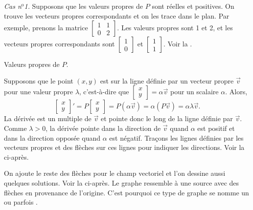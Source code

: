 \emph{Cas n$^\text{o}$1.} Supposons que les valeurs propres de $P$ sont réelles et positives. On trouve les vecteurs propres correspondants et on les trace dans le plan. Par exemple, prenons la matrice $\left[ \begin{smallmatrix} 1 & 1 \\ 0 & 2 \end{smallmatrix}
\right]$.
Les valeurs propres sont 1 et 2, et les vecteurs propres correspondants sont
$\left[ \begin{smallmatrix} 1 \\ 0 \end{smallmatrix} \right]$ et
$\left[ \begin{smallmatrix} 1 \\ 1 \end{smallmatrix} \right]$. Voir la
.

\begin{mywrapfig}{3.25in}
\capstart
{}
\caption{Valeurs propres de $P$.\label{pln:source-eigfig}}
\end{mywrapfig}

Supposons que le point $(x,y)$ est sur la ligne définie par un vecteur propre
$\vec{v}$ pour une valeur propre $\lambda$,
c'est-à-dire que
$\left[ \begin{smallmatrix} x \\ y \end{smallmatrix} \right] = \alpha \vec{v}$
pour un scalaire $\alpha$.
Alors, 
\begin{equation*}
\begin{bmatrix} x \\ y \end{bmatrix} '
=
P \begin{bmatrix} x \\ y \end{bmatrix}
=
P ( \alpha \vec{v} ) = \alpha ( P \vec{v} )
= \alpha \lambda \vec{v} .
\end{equation*}
La dérivée est un multiple de $\vec{v}$ et pointe donc le long de la ligne définie par $\vec{v}$. Comme $\lambda > 0$, la dérivée pointe dans la direction de $\vec{v}$ quand $\alpha$ est positif et dans la direction opposée quand $\alpha$ est négatif. Traçons les lignes définies par les vecteurs propres et des flèches sur ces lignes pour indiquer les directions.
Voir la  ci-après. 

On ajoute le reste des flèches pour le champ vectoriel et l'on dessine aussi quelques solutions. Voir la
 ci-après.
Le graphe ressemble à une source avec des flèches en provenance de l'origine. C'est pourquoi ce type de graphe se nomme un \emph{} ou parfois \emph{}. %

